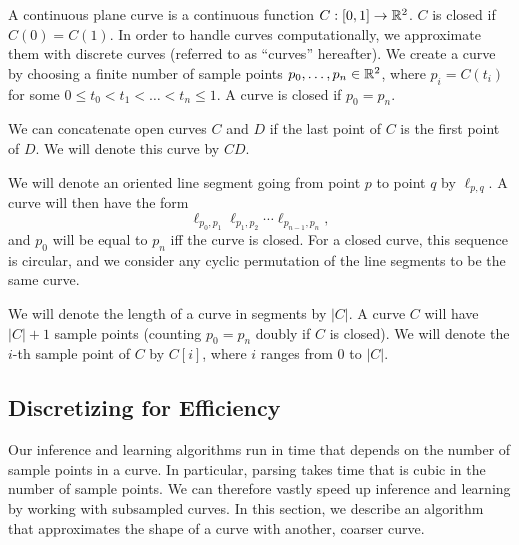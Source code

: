 
A continuous plane curve is a continuous function $C:[0,1]\to
\mathbb{R}^2$. $C$ is closed if $C(0) = C(1)$. In order to handle curves
computationally, we approximate them with discrete curves (referred to
as ``curves'' hereafter). We create a curve by choosing a finite
number of sample points $p_0,\dots,p_n\in \mathbb{R}^2$, where $p_i =
C(t_i)$ for some $0\le t_0 < t_1 < \ldots < t_n \le 1$. A curve is
closed if $p_0 = p_n$.

We can concatenate open curves $C$ and $D$ if the last point of $C$ is
the first point of $D$. We will denote this curve by $CD$. 

We will denote an oriented line segment going from point $p$ to point
$q$ by $\ell_{p,q}$. A curve will then have the form
$$ \ell_{p_0,p_1} \ell_{p_1,p_2}\cdots \ell_{p_{n-1},p_n},$$ and
$p_0$ will be equal to $p_n$ iff the curve is closed. For a closed
curve, this sequence is circular, and we consider any cyclic
permutation of the line segments to be the same curve.

We will denote the length of a curve in segments by $|C|$. A curve $C$
will have $|C|+1$ sample points (counting $p_0 = p_n$ doubly if $C$ is
closed). We will denote the $i$-th sample point of $C$ by $C[i]$,
where $i$ ranges from $0$ to $|C|$.


\subsection{Discretizing for Efficiency}

Our inference and learning algorithms run in time that depends on the
number of sample points in a curve. In particular, parsing takes time
that is cubic in the number of sample points. We can therefore vastly
speed up inference and learning by working with subsampled curves. In
this section, we describe an algorithm that approximates the shape of
a curve with another, coarser curve. 

